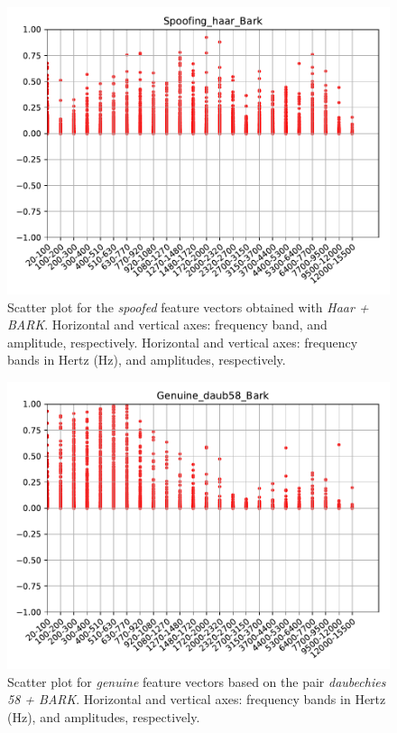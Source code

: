 		\begin{figure}[H]
			\centering
			\includegraphics[scale=.7]{images/results/barkVersusMel/Spoofing_haar_Bark.pdf}
			\caption{Scatter plot for the \textit{spoofed} feature vectors obtained with \textit{Haar + BARK}. Horizontal and vertical axes: frequency band, and amplitude, respectively. Horizontal and vertical axes: frequency bands in Hertz (Hz), and amplitudes, respectively.}
			\label{fig:spoofinghaarbark}
		\end{figure}
		\begin{figure}[H]
			\centering
			\includegraphics[scale=.7]{images/results/barkVersusMel/Genuine_daub58_Bark.pdf}
			\caption{Scatter plot for \textit{genuine} feature vectors based on the pair \textit{daubechies 58 + BARK}. Horizontal and vertical axes: frequency bands in Hertz (Hz), and amplitudes, respectively.}
			\label{fig:livedaub58bark}
		\end{figure}
